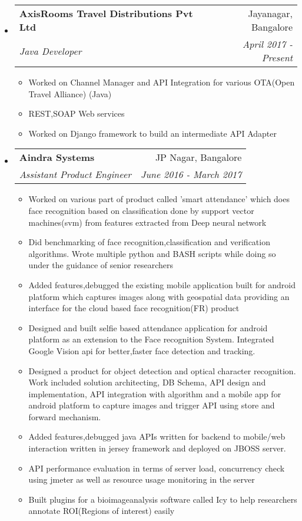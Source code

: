\documentclass[letterpaper,11pt]{article}
\makeatletter
\newcommand{\resitem}[1]{\item #1 \vspace{-2pt}}
\newcommand{\ressubheading}[4]{
\begin{tabular*}{6.5in}{l@{\extracolsep{\fill}}r}
		\textbf{#1} & #2 \\
		\textit{#3} & \textit{#4} \\
\end{tabular*}\vspace{-6pt}}
\makeatother
\begin{document}
\begin{itemize}
\item
	\ressubheading{AxisRooms Travel  Distributions Pvt Ltd}{Jayanagar, Bangalore}{Java Developer}{April 2017 - Present}
	\begin{itemize}
		\resitem{Worked on Channel Manager and API Integration for various OTA(Open Travel Alliance) (Java)}
		\resitem{REST,SOAP Web services}
		\resitem{Worked on Django framework to build an intermediate API Adapter}
	\end{itemize}

\end{itemize}


\begin{itemize}
\item
	\ressubheading{Aindra Systems}{JP Nagar, Bangalore}{Assistant Product Engineer}{June 2016 - March 2017}
	\begin{itemize}
		\resitem{Worked on various part of product called 'smart attendance' which does face recognition based on classification done by support vector machines(svm) from features extracted from Deep neural network}
		\resitem{Did benchmarking of face recognition,classification and verification algorithms. Wrote multiple python and BASH scripts while doing so under the guidance of senior researchers}
		\resitem{Added features,debugged the existing mobile application built for android platform which captures images along with geospatial data providing an interface for the cloud based face recognition(FR) product}
		\resitem{Designed and built selfie based attendance application for android platform as an extension to the Face recognition System. Integrated Google Vision api for better,faster face detection and tracking.}
		\resitem{Designed a product for object detection and optical character recognition. Work included solution architecting, DB Schema, API design and implementation, API integration with algorithm and a mobile app for android platform to capture images and trigger API using store and forward mechanism.}
		\resitem{Added features,debugged java APIs written for backend to mobile/web interaction written in jersey framework and deployed on JBOSS server.}
		\resitem{API performance evaluation in terms of server load, concurrency check using jmeter as well as resource usage monitoring in the server}
		\resitem{Built plugins for a bioimageanalysis software called Icy to help researchers annotate ROI(Regions of interest) easily}
		\end{itemize}
\end{itemize}
\end{document}
